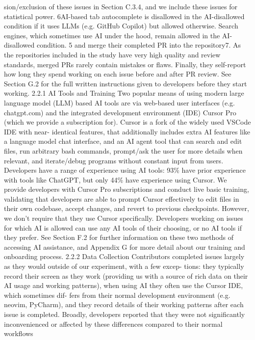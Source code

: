 sion/exclusion of these issues in Section C.3.4, and we include these issues for statistical power.
6AI-based tab autocomplete is disallowed in the AI-disallowed condition if it uses LLMs (e.g. GitHub
Copilot) but allowed otherwise. Search engines, which sometimes use AI under the hood, remain allowed in
the AI-disallowed condition.
5
and merge their completed PR into the repository7. As the repositories included in the study have
very high quality and review standards, merged PRs rarely contain mistakes or flaws. Finally, they
self-report how long they spend working on each issue before and after PR review.
See Section G.2 for the full written instructions given to developers before they start working.
2.2.1
AI Tools and Training
Two popular means of using modern large language model (LLM) based AI tools are via web-based
user interfaces (e.g. chatgpt.com) and the integrated development environment (IDE) Cursor Pro
(which we provide a subscription for). Cursor is a fork of the widely used VSCode IDE with near-
identical features, that additionally includes extra AI features like a language model chat interface,
and an AI agent tool that can search and edit files, run arbitrary bash commands, prompt/ask the
user for more details when relevant, and iterate/debug programs without constant input from users.
Developers have a range of experience using AI tools: 93\% have prior experience with tools like
ChatGPT, but only 44\% have experience using Cursor.
We provide developers with Cursor Pro subscriptions and conduct live basic training, validating that
developers are able to prompt Cursor effectively to edit files in their own codebase, accept changes,
and revert to previous checkpoints. However, we don’t require that they use Cursor specifically.
Developers working on issues for which AI is allowed can use any AI tools of their choosing, or no
AI tools if they prefer. See Section F.2 for further information on these two methods of accessing
AI assistance, and Appendix G for more detail about our training and onboarding process.
2.2.2
Data Collection
Contributors completed issues largely as they would outside of our experiment, with a few excep-
tions: they typically record their screen as they work (providing us with a source of rich data on their
AI usage and working patterns), when using AI they often use the Cursor IDE, which sometimes dif-
fers from their normal development environment (e.g. neovim, PyCharm), and they record details of
their working patterns after each issue is completed. Broadly, developers reported that they were not
significantly inconvenienced or affected by these differences compared to their normal workflows
